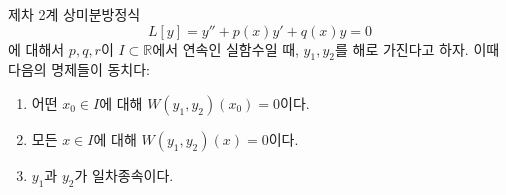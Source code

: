 \documentclass[../engineering_mathematics_lecture_note.tex]{subfiles}
\begin{document}
\begin{theorem} \label{thm:wronskian_independence}
    제차 2계 상미분방정식
    \begin{equation*}
        L[y] = y'' + p(x) y' + q(x) y = 0
    \end{equation*}
    에 대해서
    $p, q, r$이 $I \subset \mathbb R$에서 연속인 실함수일 때, $y_1, y_2$를 해로 가진다고 하자.
    이때 다음의 명제들이 동치다:
    \begin{enumerate}
        \item 어떤 $x_0 \in I$에 대해 $W(y_1, y_2)(x_0) = 0$이다.
        \item 모든 $x \in I$에 대해 $W(y_1, y_2)(x) = 0$이다.
        \item $y_1$과 $y_2$가 일차종속이다.
    \end{enumerate}
\end{theorem}
\end{document}

